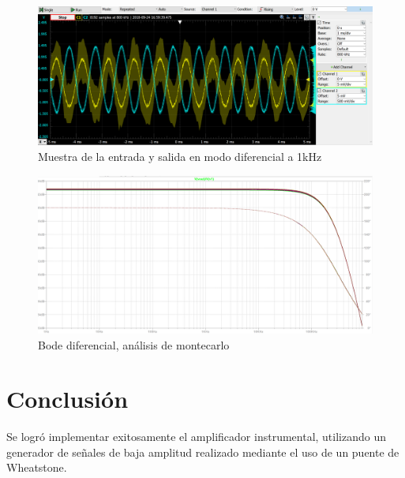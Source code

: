 \documentclass[../../tc_tp3_main.tex]{subfiles}
\begin{document}
		\begin{figure}[h!]	
		\centering
		\includegraphics[scale=0.6]{imagenes/ganancia_diferencial_medido.png}
		\caption{Muestra de la entrada y salida en modo diferencial a 1kHz}
		\label{fig:ej3_ganancia_diferencial_medido}
	\end{figure}

		\begin{figure}[h!]	
		\centering
		\includegraphics[scale=0.4]{imagenes/bode_diferencial_montecarlo.png}
		\caption{Bode diferencial, análisis de montecarlo}
		\label{fig:ej3_bode_diferencial_montecarlo}
	\end{figure}

\section{Conclusión}

Se logró implementar exitosamente el amplificador instrumental, utilizando un generador de señales de baja amplitud realizado mediante el uso de un puente de Wheatstone.
\end{document}
